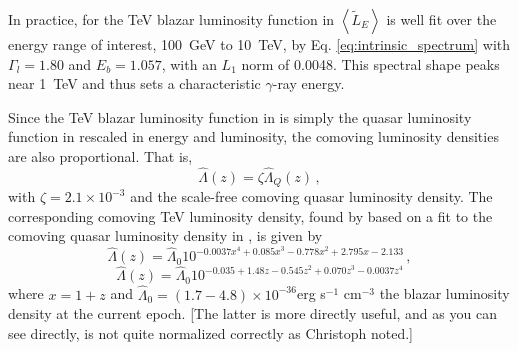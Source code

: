 \documentclass[numberedappendix]{emulateapj}
\begin{document}
{In practice, for the TeV blazar luminosity function in
\citet{2014ApJ...790..137B} $\left< \tilde{L}_E \right>$ is well fit
over the energy range of interest, 100~GeV to 10~TeV, by
Eq. \ref{eq:intrinsic_spectrum} with $\Gamma_l=1.80$ and $E_b=1.057$,
with an $L_1$ norm of 0.0048.  This spectral shape peaks near 1~TeV
and thus sets a characteristic $\gamma$-ray energy.

Since the TeV blazar luminosity function in
\citet{2014ApJ...790..137B} is simply the quasar luminosity function
in \citet{2007ApJ...654..731H} rescaled in energy and luminosity, the
comoving luminosity densities are also proportional.  That is,
\begin{equation}
\hat{\Lambda}(z) = \zeta \hat{\Lambda}_Q(z)\,,
\end{equation}
with $\zeta=2.1\times 10^{-3}$ and the scale-free comoving quasar
luminosity density.  The corresponding comoving TeV luminosity
density, found by \citet{2012ApJ...752...23C} based on a fit to the
comoving quasar luminosity density in \citet{2007ApJ...654..731H}, is
given by
\begin{equation}
\label{eq:phi_quasar}
\hat{\Lambda}(z)=\hat{\Lambda}_0 10^{-0.0037x^4+0.085x^3-0.778x^2+2.795x-2.133}\,,
\end{equation}
\begin{equation}
\label{eq:phi_quasar}
\hat{\Lambda}(z)=\hat{\Lambda}_0 10^{-0.035+1.48z-0.545z^2+0.070z^3-0.0037z^4}
\end{equation}
where $x=1+z$ and
$\hat{\Lambda}_0=(1.7-4.8)\times 10^{-36}$erg s$^{-1}$ cm$^{-3}$ the
blazar luminosity density at the current epoch. 
[The latter is more directly useful, and as you can see directly, is not quite normalized correctly as Christoph noted.]


}
\end{document}
